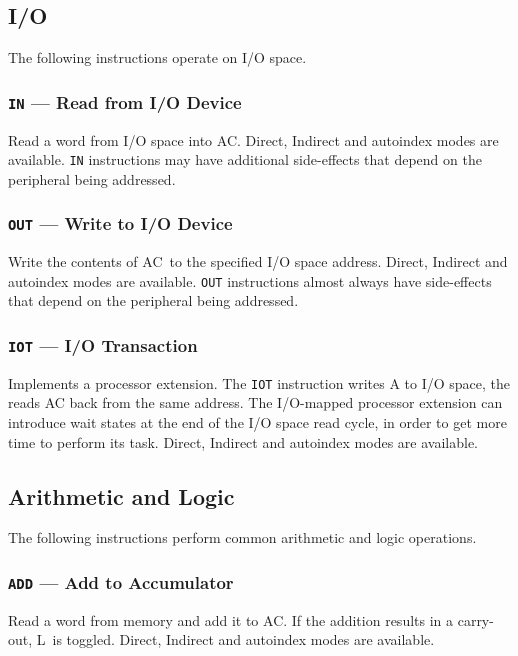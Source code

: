 \documentclass[11pt,a4paper,twocolumns]{article}
\newcommand\register[1]{\textsf{#1}}
\newcommand\A{\register{AC}}
\newcommand\Lreg{\register{L}}
\begin{document}
\subsection{I/O}

The following instructions operate on I/O space.

\subsubsection{{\tt IN} — Read from I/O Device}
\label{sec-in}

Read a word from I/O space into \A. Direct, Indirect and autoindex
modes are available. {\tt IN} instructions may have additional
side-effects that depend on the peripheral being addressed.

\subsubsection{{\tt OUT} — Write to I/O Device}
\label{sec-out}

Write the contents of \A\ to the specified I/O space address. Direct,
Indirect and autoindex modes are available. {\tt OUT} instructions
almost always have side-effects that depend on the peripheral being
addressed.

\subsubsection{{\tt IOT} — I/O Transaction}
\label{sec-iot}

Implements a processor extension. The {\tt IOT} instruction writes A
to I/O space, the reads \A{} back from the same address. The I/O-mapped
processor extension can introduce wait states at the end of the I/O
space read cycle, in order to get more time to perform its
task. Direct, Indirect and autoindex modes are available.

\subsection{Arithmetic and Logic}

The following instructions perform common arithmetic and logic operations.

\subsubsection{{\tt ADD} — Add to Accumulator}
\label{sec-add}

Read a word from memory and add it to \A. If the addition results in a
carry-out, \Lreg\  is toggled. Direct, Indirect and autoindex modes are
available.
\end{document}
